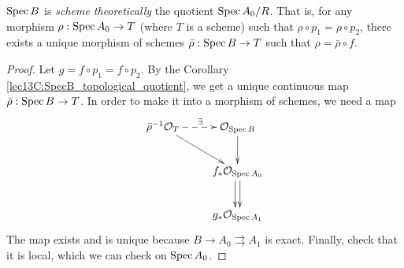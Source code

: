 
 \begin{lemma}\label{lec13L:SpecB_scheme_quotient}
   $\operatorname{Spec} B$ is \emph{scheme theoretically} the quotient $\operatorname{Spec} A_0/R$. That is, for
   any morphism $\rho:\operatorname{Spec} A_0\to T$ (where $T$ is a scheme) such that $\rho\circ
   p_1=\rho\circ p_2$, there exists a unique morphism of schemes $\bar\rho:\operatorname{Spec} B\to
   T$ such that $\rho=\bar\rho\circ f$.
 \end{lemma}
 \begin{proof}
   Let $g=f\circ p_1=f\circ p_2$. By the Corollary
   \ref{lec13C:SpecB_topological_quotient}, we get a unique continuous map
   $\bar\rho:\operatorname{Spec} B\to T$. In order to make it into a morphism of schemes, we need a map
   \[\xymatrix{
    \bar\rho^{-1}\O_T\ar[dr] \ar@{-->}[r]^\exists & \O_{\spec B}\ar[d]\\
    & f_*\O_{\spec A_0}\ar@<.5ex>[d]\ar@<-.5ex>[d] \\
    & g_*\O_{\spec A_1}
   }\]
    The map exists and is unique because $B\to A_0\rightrightarrows A_1$ is
   exact. Finally, check that it is local, which we can check on $\operatorname{Spec}
   A_0$.
 \end{proof}

